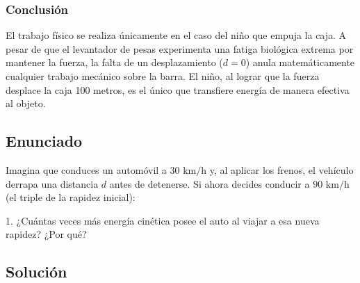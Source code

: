 \documentclass[a4paper,12pt]{article}
\begin{document}
\subsubsection*{Conclusión}
El trabajo físico se realiza únicamente en el caso del niño que empuja la caja. A pesar de que el levantador de pesas experimenta una fatiga biológica extrema por mantener la fuerza, la falta de un desplazamiento ($d = 0$) anula matemáticamente cualquier trabajo mecánico sobre la barra. El niño, al lograr que la fuerza desplace la caja 100 metros, es el único que transfiere energía de manera efectiva al objeto.

\newpage

\subsection*{Enunciado}
Imagina que conduces un automóvil a $30\text{ km/h}$ y, al aplicar los frenos, el vehículo derrapa una distancia $d$ antes de detenerse. Si ahora decides conducir a $90\text{ km/h}$ (el triple de la rapidez inicial):

1. ¿Cuántas veces más energía cinética posee el auto al viajar a esa nueva rapidez? ¿Por qué?

\begin{center}
\end{center}

\subsection*{Solución}
\end{document}
